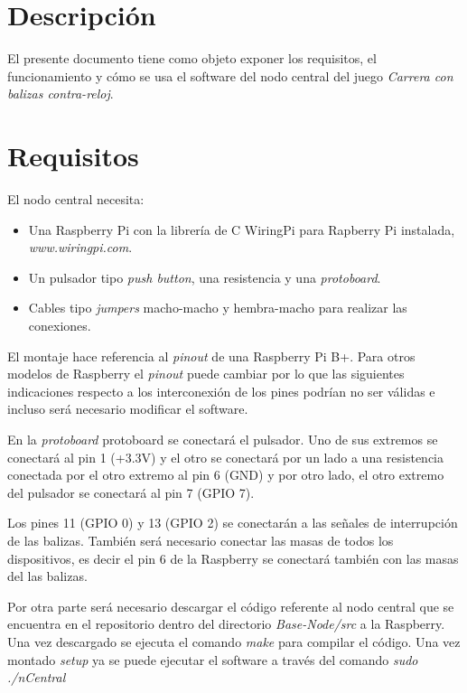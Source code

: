 \section{Descripción}
El presente documento tiene como objeto exponer los requisitos, el funcionamiento  y cómo se usa el software del nodo central del juego \textit{Carrera con balizas contra-reloj}.

\section{Requisitos}
El nodo central necesita:
\begin{itemize}

   \item Una Raspberry Pi con la librería de C WiringPi para Rapberry Pi instalada, \textit{www.wiringpi.com}.
   \item Un pulsador tipo \textit{push button}, una resistencia y una \textit{protoboard}.
   \item Cables tipo \textit{jumpers} macho-macho y hembra-macho para realizar las conexiones.

\end{itemize}

El montaje hace referencia al \textit{pinout} de una Raspberry Pi B+. Para otros modelos de Raspberry el \textit{pinout} puede cambiar por lo que las siguientes indicaciones respecto a los interconexión de los pines podrían no ser válidas e incluso será necesario modificar el software.

En la \textit{protoboard} protoboard se conectará el pulsador. Uno de sus extremos se conectará al pin 1 (+3.3V) y el otro se conectará por un lado a una resistencia conectada por el otro extremo al pin 6 (GND) y por otro lado, el otro extremo del pulsador se conectará al pin 7 (GPIO 7).

Los pines 11 (GPIO 0) y 13 (GPIO 2) se conectarán a las señales de interrupción de las balizas. También será necesario conectar las masas de todos los dispositivos, es decir el pin 6 de la Raspberry se conectará también con las masas del las balizas.

Por otra parte será necesario descargar el código referente al nodo central que se encuentra en el repositorio dentro del directorio \textit{Base-Node/src} a la Raspberry. Una vez descargado se ejecuta el comando \textit{make} para compilar el código. Una vez montado \textit{setup} ya se puede ejecutar el software a través del comando \textit{sudo ./nCentral}

